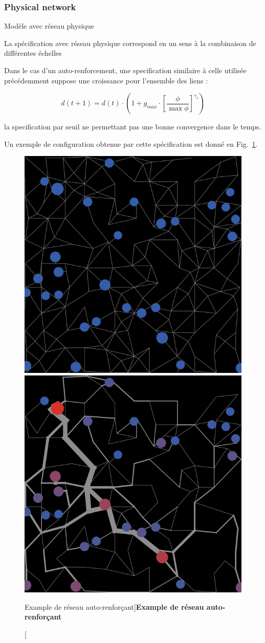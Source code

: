 \subsubsection{Physical network}{Modèle avec réseau physique}



La spécification avec réseau physique correspond en un sens à la combinaison de différentes échelles



Dans le cas d'un auto-renforcement, une specification similaire à celle utilisée précédemment suppose une croissance pour l'ensemble des liens :

\[
d(t+1) = d(t)\cdot \left(1 + g_{max} \cdot \left[\frac{\phi}{\max \phi}\right]^{\gamma_s}\right)
\]

la specification par seuil ne permettant pas une bonne convergence dans le temps.

Un exemple de configuration obtenue par cette spécification est donné en Fig.~\ref{fig:macrocoevolution:slimemould}.


\begin{figure}
	\includegraphics[width=0.45\linewidth]{Figures/MacroCoEvol/example_slimemould_1_t0}
	\includegraphics[width=0.45\linewidth]{Figures/MacroCoEvol/example_slimemould_1_tf}
	\caption[][Example de réseau auto-renforçant]{}{\textbf{Example de réseau auto-renforçant}\label{fig:macrocoevolution:slimemould}}
\end{figure}


